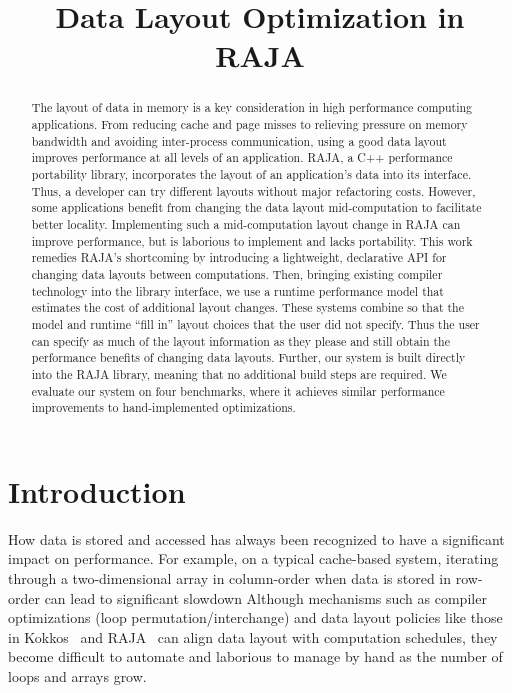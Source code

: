\documentclass[sigconf,review=true]{acmart}
\title{Data Layout Optimization in RAJA}
\begin{document}
\begin{abstract}

The layout of data in memory is a key consideration in high performance computing applications.
From reducing cache and page misses to relieving pressure on memory bandwidth and avoiding inter-process communication, using a good data layout improves performance at all levels of an application.
RAJA, a C++ performance portability library, incorporates the layout of an application's data into its interface.
Thus, a developer can try different layouts without major refactoring costs.
However, some applications benefit from changing the data layout mid-computation to facilitate better locality.
Implementing such a mid-computation layout change in RAJA can improve performance, but is laborious to implement and lacks portability.
This work remedies RAJA's shortcoming by introducing a lightweight, declarative API for changing data layouts between computations.
Then, bringing existing compiler technology into the library interface, we use a runtime performance model that estimates the cost of additional layout changes.
These systems combine so that the model and runtime \enquote{fill in} layout choices that the user did not specify.
Thus the user can specify as much of the layout information as they please and still obtain the performance benefits of changing data layouts.  
Further, our system is built directly into the RAJA library, meaning that no additional build steps are required.
We evaluate our system on four benchmarks, where it achieves similar performance improvements to hand-implemented optimizations.
\end{abstract}
\maketitle
\def\@textbottom{\vskip \z@ \@plus 1pt}




\section{Introduction}

How data is stored and accessed has always been recognized to have a significant impact on performance. 
For example, on a typical cache-based system, iterating through a two-dimensional array in column-order when data is 
stored in row-order can lead to significant slowdown 
Although mechanisms such as compiler optimizations (loop permutation/interchange) 
and data layout policies like those in Kokkos~\cite{edwards2014kokkos} and RAJA~\cite{hornung2014RAJA} can align data layout with computation schedules, they become difficult to automate and laborious to manage by hand as the number of loops and arrays grow.
\end{document}
